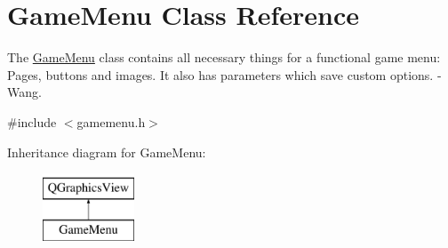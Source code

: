 \hypertarget{class_game_menu}{}\section{Game\+Menu Class Reference}
\label{class_game_menu}


The \hyperlink{class_game_menu}{Game\+Menu} class contains all necessary things for a functional game menu\+: Pages, buttons and images. It also has parameters which save custom options. -\/ Wang.  




{\ttfamily \#include $<$gamemenu.\+h$>$}

Inheritance diagram for Game\+Menu\+:\begin{figure}[H]
\begin{center}
\leavevmode
\includegraphics[height=2.000000cm]{class_game_menu}
\end{center}
\end{figure}
